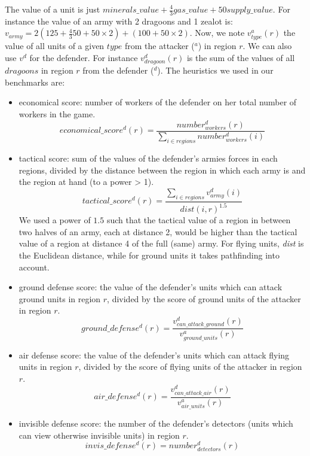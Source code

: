 The value of a unit is just $minerals\_value + \frac{4}{3}gas\_value + 50supply\_value$. For instance the value of an army with 2 dragoons and 1 zealot is: $v_{army} = 2(125+\frac{4}{3}50+50\times2)+(100+50\times2)$. Now, we note $v^{a}_{type}(r)$ the value of all units of a given $type$ from the attacker ($^{a}$) in region $r$. We can also use $v^d$ for the defender. For instance $v_{dragoon}^d(r)$ is the sum of the values of all $dragoons$ in region $r$ from the defender ($^d$). The heuristics we used in our benchmarks are: 
\begin{itemize}
    \item economical score: number of workers of the defender on her total number of workers in the game.
$$economical\_score^d(r) = \frac{number^d_{workers}(r)}{\sum_{i \in regions} number^d_{workers}(i)}$$

    \item tactical score: sum of the values of the defender's armies forces in each regions, divided by the distance between the region in which each army is and the region at hand (to a power > 1). 
$$tactical\_score^d(r) =\frac{\sum_{i \in regions} v^d_{army}(i)}{dist(i,r)^{1.5}}$$%
We used a power of $1.5$ such that the tactical value of a region in between two halves of an army, each at distance 2, would be higher than the tactical value of a region at distance 4 of the full (same) army. For flying units, \textit{dist} is the Euclidean distance, while for ground units it takes pathfinding into account.

    \item ground defense score: the value of the defender's units which can attack ground units in region $r$, divided by the score of ground units of the attacker in region $r$.
$$ground\_defense^d(r) = \frac{v^d_{can\_attack\_ground}(r)}{v^a_{ground\_units}(r)}$$

    \item air defense score: the value of the defender's units which can attack flying units in region $r$, divided by the score of flying units of the attacker in region $r$.
$$air\_defense^d(r) = \frac{v^d_{can\_attack\_air}(r)}{v^a_{air\_units}(r)}$$

    \item invisible defense score: the number of the defender's detectors (units which can view otherwise invisible units) in region $r$.
$$invis\_defense^d(r) = number^d_{detectors}(r)$$
\end{itemize}

